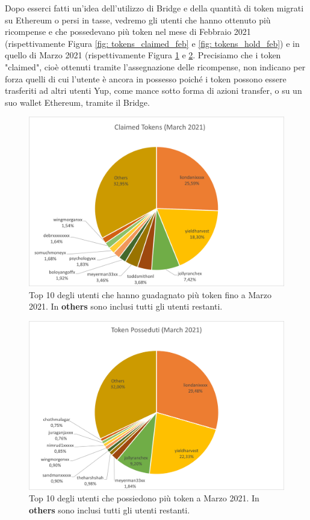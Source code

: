 Dopo esserci fatti un'idea dell'utilizzo di Bridge e della quantità di token migrati su Ethereum o persi in tasse, vedremo gli utenti che hanno ottenuto più ricompense e che possedevano più token nel mese di Febbraio 2021 (rispettivamente Figura \ref{fig: tokens_claimed_feb} e \ref{fig: tokens_hold_feb}) e in quello di Marzo 2021 (rispettivamente Figura \ref{fig: tokens_claimed_march} e \ref{fig: tokens_hold_march}.
Precisiamo che i token "claimed", cioè ottenuti tramite l'assegnazione delle ricompense, non indicano per forza quelli di cui l'utente è ancora in possesso poiché i token possono essere trasferiti ad altri utenti Yup, come mance sotto forma di azioni transfer, o su un suo wallet Ethereum, tramite il Bridge.


\begin{figure}[t]
    \centering
    \includegraphics[width=1\textwidth]{graphs/token_claimed_march.png}
    \caption{Top 10 degli utenti che hanno guadagnato più token fino a Marzo 2021. In \textbf{others} sono inclusi tutti gli utenti restanti.}
    \label{fig: tokens_claimed_march}
\end{figure}    
\begin{figure}[t]
    \centering
    \includegraphics[width=1\textwidth]{graphs/token_posseduti_march.png}
    \caption{Top 10 degli utenti che possiedono più token a Marzo 2021. In \textbf{others} sono inclusi tutti gli utenti restanti.}
    \label{fig: tokens_hold_march}
\end{figure}

